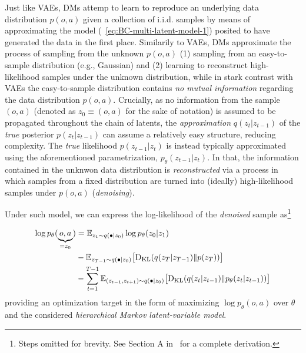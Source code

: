 Just like VAEs, DMs attemp to learn to reproduce an underlying data distribution \( p (o,a) \) given a collection of i.i.d. samples by means of approximating the model (~\ref{eq:BC-multi-latent-model-1}) posited to have generated the data in the first place.
Similarily to VAEs, DMs approximate the process of sampling from the unknown \( p(o,a) \) (1) sampling from an easy-to-sample distribution (e.g., Gaussian) and (2) learning to reconstruct high-likelihood samples under the unknown distribution, while in stark contrast with VAEs the easy-to-sample distribution contains \emph{no mutual information} regarding the data distribution \( p(o,a) \).
Crucially, as no information from the sample \( (o,a) \) (denoted as \( z_0 \equiv (o,a) \) for the sake of notation) is assumed to be propagated throughout the chain of latents, the \emph{approximation} \( q(z_t \vert z_{t-1} ) \) of the \emph{true} posterior \( p(z_t \vert z_{t-1})\) can assume a relatively easy structure, reducing complexity.
The \emph{true} likelihood \( p(z_{t-1} \vert z_t) \) is instead typically approximated using the aforementioned parametrization, \(  p_\theta (z_{t-1} \vert z_t) \).
In that, the information contained in the unknwon data distribution is \emph{reconstructed} via a process in which samples from a fixed distribution are turned into (ideally) high-likelihood samples under \( p(o,a) \) (\emph{denoising}).

Under such model, we can express the log-likelihood of the \emph{denoised} sample as\footnote{Steps omitted for brevity. See Section A in~\citet{hoDenoisingDiffusionProbabilistic2020} for a complete derivation.
}

\begin{align}
    \log p_\theta (\underbrace{o,a}_{= z_0}) &= \mathbb{E}_{z_1 \sim q(\bullet \vert z_0)} \log p_\theta (z_0 \vert z_1) \label{eq:diffusion-likelihood} \\
    &- \mathbb{E}_{z_{T-1} \sim q(\bullet \vert z_0)} \big[ \text{D}_{\text{KL}} (q(z_T \vert z_{T-1}) \Vert p(z_T) ) \big] \notag \\ 
    &- \sum_{t=1}^{T-1} \mathbb{E}_{(z_{t-1}, z_{t+1}) \sim q(\bullet \vert z_0)} \big[ \text{D}_{\text{KL}} (q(z_t \vert z_{t-1}) \Vert p_\theta(z_t \vert z_{t-1}) ) \big] \notag
\end{align}
providing an optimization target in the form of maximizing \( \log p_\theta(o,a) \) over \( \theta \) and the considered \emph{hierarchical Markov latent-variable model}.

